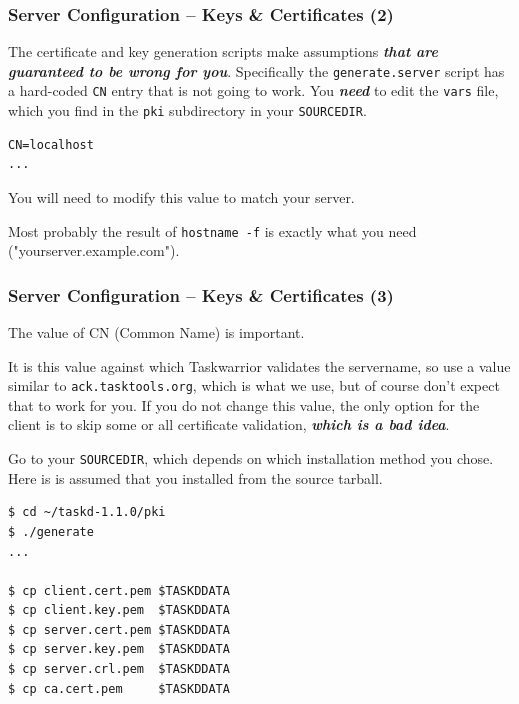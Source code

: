 \documentclass[t,handout]{beamer}
\begin{document}
\begin{frame}[fragile]\frametitle{Server Configuration -- Keys \& Certificates (2)}
    \vfill
    The certificate and key generation scripts make assumptions \textbf{\emph{that are guaranteed to be wrong for you}}. Specifically the \verb+generate.server+ script has a hard-coded \verb+CN+ entry that is not going to work. You \textbf{\emph{need}} to edit the \verb+vars+ file, which you find in the \verb=pki= subdirectory in your \verb=SOURCEDIR=.

\begin{lstlisting}
CN=localhost
...\end{lstlisting}

    You will need to modify this value to match your server.

    Most probably the result of \verb+hostname -f+ is exactly what you need ("yourserver.example.com").
\end{frame}

\begin{frame}[fragile]\frametitle{Server Configuration -- Keys \& Certificates (3)}
    \vfill
    The value of CN (Common Name) is important.

    It is this value against which Taskwarrior validates the servername, so use a value similar to \verb+ack.tasktools.org+, which is what we use, but of course don't expect that to work for you. If you do not change this value, the only option for the client is to skip some or all certificate validation, \textbf{\emph{which is a bad idea}}.

    Go to your \verb+SOURCEDIR+, which depends on which installation method you chose. Here is is assumed that you installed from the source tarball.

    \begin{lstlisting}
$ cd ~/taskd-1.1.0/pki
$ ./generate
...

$ cp client.cert.pem $TASKDDATA
$ cp client.key.pem  $TASKDDATA
$ cp server.cert.pem $TASKDDATA
$ cp server.key.pem  $TASKDDATA
$ cp server.crl.pem  $TASKDDATA
$ cp ca.cert.pem     $TASKDDATA\end{lstlisting}
\end{frame}
\end{document}
